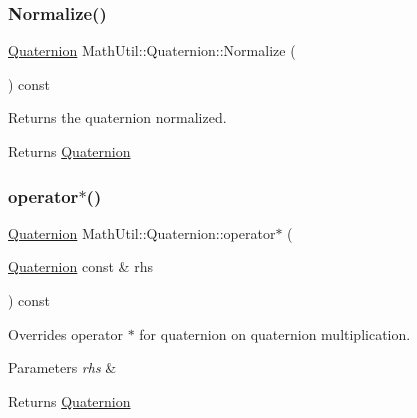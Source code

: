 \subsubsection{\texorpdfstring{Normalize()}{Normalize()}}
{\footnotesize\ttfamily \hyperlink{structMathUtil_1_1Quaternion}{Quaternion} Math\+Util\+::\+Quaternion\+::\+Normalize (\begin{DoxyParamCaption}{ }\end{DoxyParamCaption}) const\hspace{0.3cm}{\ttfamily [inline]}}



Returns the quaternion normalized. 

\begin{DoxyReturn}{Returns}
\hyperlink{structMathUtil_1_1Quaternion}{Quaternion} 
\end{DoxyReturn}
\mbox{\label{structMathUtil_1_1Quaternion_aab39eda1b4a6960913b0e476e1c00adc}} 
\subsubsection{\texorpdfstring{operator$\ast$()}{operator*()}\hspace{0.1cm}{\footnotesize\ttfamily [1/2]}}
{\footnotesize\ttfamily \hyperlink{structMathUtil_1_1Quaternion}{Quaternion} Math\+Util\+::\+Quaternion\+::operator$\ast$ (\begin{DoxyParamCaption}\item[{\hyperlink{structMathUtil_1_1Quaternion}{Quaternion} const \&}]{rhs }\end{DoxyParamCaption}) const\hspace{0.3cm}{\ttfamily [inline]}}



Overrides operator $\ast$ for quaternion on quaternion multiplication. 


\begin{DoxyParams}{Parameters}
{\em rhs} & \\
\hline
\end{DoxyParams}
\begin{DoxyReturn}{Returns}
\hyperlink{structMathUtil_1_1Quaternion}{Quaternion} 
\end{DoxyReturn}
\mbox{\label{structMathUtil_1_1Quaternion_af7ed7435e597af9797b5188bba6c8dd1}} 
